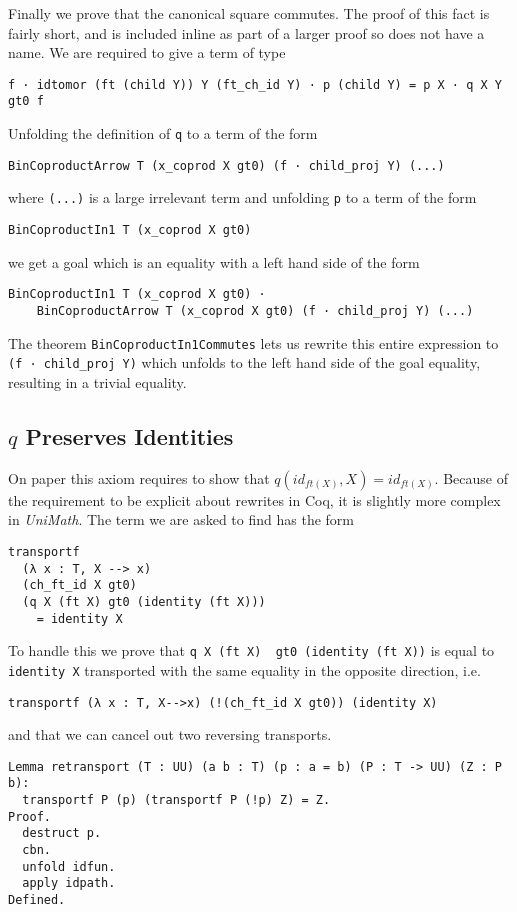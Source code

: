 Finally we prove that the canonical square commutes. The proof of this fact is
fairly short, and is included inline as part of a larger proof so does not have
a name. We are required to give a term of type
\begin{lstlisting}
f · idtomor (ft (child Y)) Y (ft_ch_id Y) · p (child Y) = p X · q X Y gt0 f
\end{lstlisting}
Unfolding the definition of \lstinline|q| to a term of the form
\begin{lstlisting}
BinCoproductArrow T (x_coprod X gt0) (f · child_proj Y) (...)
\end{lstlisting}
where \lstinline|(...)| is a large irrelevant term and unfolding \lstinline|p|
to a term of the form
\begin{lstlisting}
BinCoproductIn1 T (x_coprod X gt0)
\end{lstlisting}
we get a goal which is an equality with a left hand side of the form
\begin{lstlisting}
BinCoproductIn1 T (x_coprod X gt0) · 
    BinCoproductArrow T (x_coprod X gt0) (f · child_proj Y) (...)
\end{lstlisting}
The theorem \lstinline|BinCoproductIn1Commutes| lets us rewrite this entire
expression to \lstinline|(f · child_proj Y)| which unfolds to the left hand side
of the goal equality, resulting in a trivial equality.

\subsection{$q$ Preserves Identities}
On paper this axiom requires to show that $q(id_{ft(X)}, X) = id_{ft(X)}$.
Because of the requirement to be explicit about rewrites in Coq, it is slightly
more complex in \textit{UniMath}. The term we are asked to find has the form
\begin{lstlisting}
transportf 
  (λ x : T, X --> x) 
  (ch_ft_id X gt0) 
  (q X (ft X) gt0 (identity (ft X))) 
    = identity X
\end{lstlisting}

To handle this we prove that \lstinline|q X (ft X)  gt0 (identity (ft X))| is
equal to \lstinline|identity X| transported with the same equality in the
opposite direction, i.e.
\begin{lstlisting}
transportf (λ x : T, X-->x) (!(ch_ft_id X gt0)) (identity X)
\end{lstlisting}
and that we can cancel out two reversing transports.
\begin{lstlisting}
Lemma retransport (T : UU) (a b : T) (p : a = b) (P : T -> UU) (Z : P b):
  transportf P (p) (transportf P (!p) Z) = Z.
Proof.
  destruct p.
  cbn.
  unfold idfun.
  apply idpath.
Defined.
\end{lstlisting}

